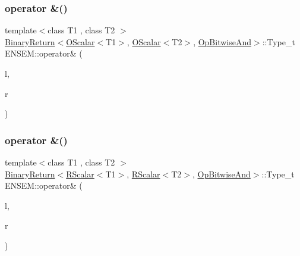 \subsubsection{\texorpdfstring{operator \&()}{operator \&()}\hspace{0.1cm}{\footnotesize\ttfamily [2/7]}}
{\footnotesize\ttfamily template$<$class T1 , class T2 $>$ \\
\mbox{\hyperlink{structENSEM_1_1BinaryReturn}{Binary\+Return}}$<$\mbox{\hyperlink{classENSEM_1_1OScalar}{O\+Scalar}}$<$T1$>$, \mbox{\hyperlink{classENSEM_1_1OScalar}{O\+Scalar}}$<$T2$>$, \mbox{\hyperlink{structENSEM_1_1OpBitwiseAnd}{Op\+Bitwise\+And}}$>$\+::Type\+\_\+t E\+N\+S\+E\+M\+::operator\& (\begin{DoxyParamCaption}\item[{const \mbox{\hyperlink{classENSEM_1_1OScalar}{O\+Scalar}}$<$ T1 $>$ \&}]{l,  }\item[{const \mbox{\hyperlink{classENSEM_1_1OScalar}{O\+Scalar}}$<$ T2 $>$ \&}]{r }\end{DoxyParamCaption})\hspace{0.3cm}{\ttfamily [inline]}}

\mbox{\label{namespaceENSEM_ga389f96c37c3b933acfc68be93291ae0e}} 
\subsubsection{\texorpdfstring{operator \&()}{operator \&()}\hspace{0.1cm}{\footnotesize\ttfamily [3/7]}}
{\footnotesize\ttfamily template$<$class T1 , class T2 $>$ \\
\mbox{\hyperlink{structENSEM_1_1BinaryReturn}{Binary\+Return}}$<$\mbox{\hyperlink{classENSEM_1_1RScalar}{R\+Scalar}}$<$T1$>$, \mbox{\hyperlink{classENSEM_1_1RScalar}{R\+Scalar}}$<$T2$>$, \mbox{\hyperlink{structENSEM_1_1OpBitwiseAnd}{Op\+Bitwise\+And}}$>$\+::Type\+\_\+t E\+N\+S\+E\+M\+::operator\& (\begin{DoxyParamCaption}\item[{const \mbox{\hyperlink{classENSEM_1_1RScalar}{R\+Scalar}}$<$ T1 $>$ \&}]{l,  }\item[{const \mbox{\hyperlink{classENSEM_1_1RScalar}{R\+Scalar}}$<$ T2 $>$ \&}]{r }\end{DoxyParamCaption})\hspace{0.3cm}{\ttfamily [inline]}}

